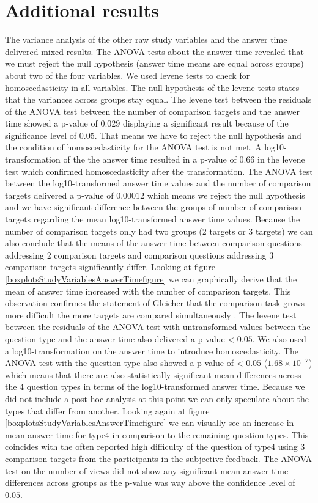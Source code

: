\section{Additional results}
The variance analysis of the other raw study variables and the answer time delivered mixed results. The ANOVA tests
about the answer time revealed that we must reject the null hypothesis (answer time means are equal across groups) about two of the four variables.
We used levene tests to check for homoscedasticity in all variables. The null hypothesis of the levene tests states that the variances across groups stay equal.
The levene test between the residuals of the ANOVA test between the number of comparison targets and the answer time showed a p-value of $0.029$ displaying a significant result
because of the significance level of $0.05$. That means we have to reject the null hypothesis and the condition of homoscedasticity for the ANOVA test is not met.
A log10-transformation of the the answer time resulted in a p-value of $0.66$ in the levene test which confirmed homoscedasticity after the transformation.
The ANOVA test between the log10-transformed answer time values and the number of comparison targets delivered a p-value of $0.00012$ which means we reject the
null hypothesis and we have significant difference between the groups of number of comparison targets regarding the mean log10-transformed answer time values.
Because the number of comparison targets only had two groups (2 targets or 3 targets) we can also conclude that the means of the answer time between comparison
questions addressing 2 comparison targets and comparison questions addressing 3 comparison targets significantly differ. Looking at figure \ref{boxplotsStudyVariablesAnswerTimefigure}
we can graphically derive that the mean of answer time increased with the number of comparison targets. This observation confirmes the statement of Gleicher that
the comparison task grows more difficult the more targets are compared simultaneously \citep*{Gleicher.2018}. 
The levene test between the residuals of the ANOVA test with untransformed values between the question type and the answer time also delivered a p-value < $0.05$.
We also used a log10-transformation on the answer time to introduce homoscedasticity. The ANOVA test with the question type also showed a p-value of
< $0.05$ ($1.68 \times 10^{-7}$) which means that there are also statistically significant mean differences across the 4 question types in terms of the
log10-transformed answer time. Because we did not include a post-hoc analysis at this point we can only speculate about the types that differ from another. Looking
again at figure \ref{boxplotsStudyVariablesAnswerTimefigure} we can visually see an increase in mean answer time for type4 in comparison to the remaining question types.
This coincides with the often reported high difficulty of the question of type4 using 3 comparison targets from the participants in the subjective feedback.
The ANOVA test on the number of views did not show any significant mean answer time differences across groups as the p-value was way above
the confidence level of $0.05$.

